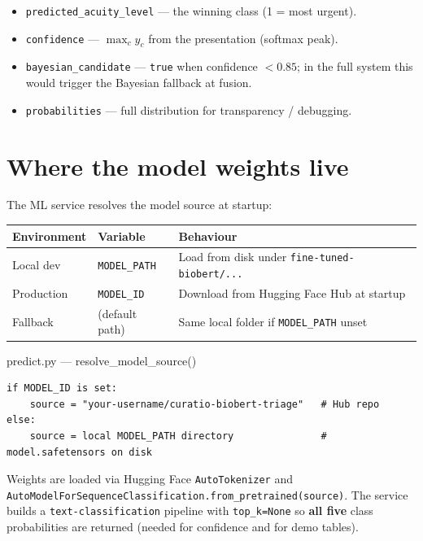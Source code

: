 \documentclass[11pt]{article}
\newcommand{\route}[1]{{\small\texttt{\textcolor{mutel}{#1}}}}
\begin{document}
\begin{itemize}
  \item \texttt{predicted\_acuity\_level} --- the winning class (1 = most urgent).
  \item \texttt{confidence} --- $\max_c \hat{y}_c$ from the presentation (softmax peak).
  \item \texttt{bayesian\_candidate} --- \texttt{true} when confidence $< 0.85$; in the full system
        this would trigger the Bayesian fallback at fusion.
  \item \texttt{probabilities} --- full distribution for transparency / debugging.
\end{itemize}

\section{Where the model weights live}

The ML service resolves the model source at startup:

\begin{center}
\begin{tabular}{@{}lll@{}}
\toprule
\textbf{Environment} & \textbf{Variable} & \textbf{Behaviour} \\
\midrule
Local dev & \texttt{MODEL\_PATH} & Load from disk under \route{fine-tuned-biobert/...} \\
Production & \texttt{MODEL\_ID} & Download from Hugging Face Hub at startup \\
Fallback & (default path) & Same local folder if \texttt{MODEL\_PATH} unset \\
\bottomrule
\end{tabular}
\end{center}

\begin{filebox}{predict.py --- resolve\_model\_source()}
\begin{lstlisting}
if MODEL_ID is set:
    source = "your-username/curatio-biobert-triage"   # Hub repo
else:
    source = local MODEL_PATH directory               # model.safetensors on disk
\end{lstlisting}
\end{filebox}

Weights are loaded via Hugging Face \texttt{AutoTokenizer} and
\texttt{AutoModelForSequenceClassification.from\_pretrained(source)}. The service builds a
\texttt{text-classification} pipeline with \texttt{top\_k=None} so \textbf{all five} class
probabilities are returned (needed for confidence and for demo tables).
\end{document}
